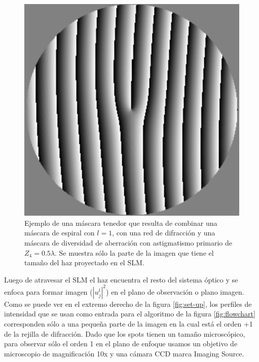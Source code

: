 \begin{figure}[h!]
\centering
\includegraphics[scale=.5]{mixed_mask_compact.pdf}
\caption[Ejemplo de una máscara tenedor con astigmatismo.]{Ejemplo de una máscara tenedor que resulta de combinar una
  máscara de espiral con $l=1$, con una red de difracción y una
  máscara de diversidad de aberración con astigmatismo primario de
  $Z_4=0.5\lambda$. Se muestra sólo la parte de la imagen que tiene el
tamaño del haz proyectado en el SLM.} 
\label{fig:mixed_mask}
\end{figure}

Luego de atravesar el SLM el haz encuentra el resto del sistema óptico
y se enfoca para formar imagen ($|u_j^l|^2$) en el plano de observación o plano
imagen. 
Como se puede ver en el extremo derecho de la figura \ref{fig:set-up},
los perfiles de intensidad que se usan como entrada para el algoritmo
de la figura \ref{fig:flowchart} corresponden sólo a una pequeña parte
de la imagen en la cual está el orden +1 de la rejilla de
difracción. Dado que los spots tienen un tamaño microscópico, para observar sólo
el orden 1 en el plano de enfoque usamos un objetivo de 
microscopio de magnificación 10x y una cámara \acrshort{CCD} marca Imaging
Source.    

